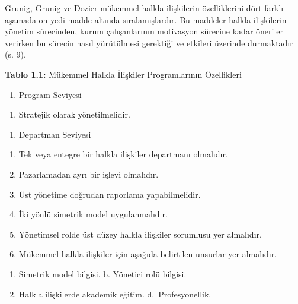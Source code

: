 \documentclass[
]{book}
\providecommand{\tightlist}{%
  \setlength{\itemsep}{0pt}\setlength{\parskip}{0pt}}
\begin{document}
Grunig, Grunig ve Dozier mükemmel halkla ilişkilerin özelliklerini dört farklı aşamada on yedi madde altında sıralamışlardır. Bu maddeler halkla ilişkilerin yönetim sürecinden, kurum çalışanlarının motivasyon sürecine kadar öneriler verirken bu sürecin nasıl yürütülmesi gerektiği ve etkileri üzerinde durmaktadır (s. 9). \citep{grunig2002excellent}

\textbf{Tablo 1.1:} Mükemmel Halkla İlişkiler Programlarının Özellikleri

\begin{enumerate}
\def\labelenumi{\Roman{enumi}.}
\tightlist
\item
  Program Seviyesi
\end{enumerate}

\begin{enumerate}
\def\labelenumi{\arabic{enumi}.}
\tightlist
\item
  Stratejik olarak yönetilmelidir.
\end{enumerate}

\begin{enumerate}
\def\labelenumi{\Roman{enumi}.}
\setcounter{enumi}{1}
\tightlist
\item
  Departman Seviyesi
\end{enumerate}

\begin{enumerate}
\def\labelenumi{\arabic{enumi}.}
\setcounter{enumi}{1}
\tightlist
\item
  Tek veya entegre bir halkla ilişkiler departmanı olmalıdır.
\item
  Pazarlamadan ayrı bir işlevi olmalıdır.
\item
  Üst yönetime doğrudan raporlama yapabilmelidir.
\item
  İki yönlü simetrik model uygulanmalıdır.
\item
  Yönetimsel rolde üst düzey halkla ilişkiler sorumlusu yer almalıdır.
\item
  Mükemmel halkla ilişkiler için aşağıda belirtilen unsurlar yer almalıdır.\\
\end{enumerate}

\begin{enumerate}
\def\labelenumi{\alph{enumi}.}
\tightlist
\item
  Simetrik model bilgisi. b. Yönetici rolü bilgisi.
\item
  Halkla ilişkilerde akademik eğitim. d.~Profesyonellik.
\end{enumerate}
\end{document}

